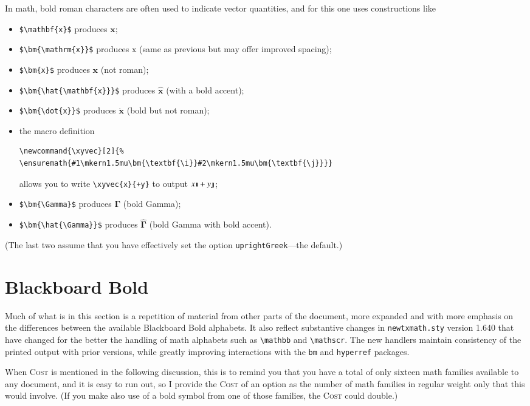 \documentclass[\fsc]{article}
\theoremstyle{oldplain}
\theoremstyle{plain}
\begin{document}
In math, bold roman characters are often used to indicate vector quantities, and for this one uses constructions like 
\begin{itemize}
\item
\verb|$\mathbf{x}$| produces $\mathbf{x}$;
\item
\verb|$\bm{\mathrm{x}}$| produces $\bm{\mathrm{x}}$ (same as previous but may offer improved spacing);
\item
\verb|$\bm{x}$| produces $\bm{x}$ (not roman);
\item
\verb|$\bm{\hat{\mathbf{x}}}$| produces $\bm{\hat{\mathbf{x}}}$ (with a bold accent);
\item \verb|$\bm{\dot{x}}$| produces $\bm{\dot{x}}$ (bold but not roman);
\item the macro definition
\begin{verbatim}
\newcommand{\xyvec}[2]{%
\ensuremath{#1\mkern1.5mu\bm{\textbf{\i}}#2\mkern1.5mu\bm{\textbf{\j}}}}
\end{verbatim}
allows you to write \verb|\xyvec{x}{+y}| to output $\xyvec{x}{+y}$;
\item \verb|$\bm{\Gamma}$| produces $\bm{\Gamma}$ (bold Gamma);
\item \verb|$\bm{\hat{\Gamma}}$| produces $\bm{\hat{\Gamma}}$ (bold Gamma with bold accent).
\end{itemize}
(The last two assume that you have effectively set the option {\tt uprightGreek}---the default.)

\section{Blackboard Bold}
Much of what is in this section is a repetition of material from other parts of the document, more expanded and with more emphasis on the differences between the available Blackboard Bold alphabets. It also reflect substantive changes  in {\tt newtxmath.sty} version 1.640 that have changed for the better  the handling of math alphabets such as \verb|\mathbb| and \verb|\mathscr|. The new handlers maintain consistency of the printed output with prior versions, while greatly improving interactions with the {\tt bm} and {\tt hyperref} packages.

When \textsc{Cost} is mentioned in the following discussion, this is to remind you that you have a total of only sixteen math families available to any document, and it is easy to run out, so I provide the \textsc{Cost} of an option as the number of math families in regular weight only that this would involve. (If you make also use of a bold symbol from one of those families, the \textsc{Cost} could double.)
\end{document}
